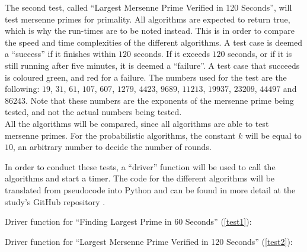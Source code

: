 \documentclass[main.tex]{subfiles}
\begin{document}
The second test, called ``Largest Mersenne Prime Verified in 120 Seconds'', will
test mersenne primes for primality. All algorithms are expected to return true,
which is why the run-times are to be noted instead. This is in order to compare
the speed and time complexities of the different algorithms. A test case is
deemed a ``success'' if it finishes within $120$ seconds. If it exceeds $120$
seconds, or if it is still running after five minutes, it is deemed a ``failure''.
A test case that succeeds is coloured green, and red for a failure. The numbers
used for the test are the following: $19$, $31$, $61$, $107$, $607$, $1279$,
$4423$, $9689$, $11213$, $19937$, $23209$, $44497$ and $86243$. Note that these
numbers are the exponents of the mersenne prime being tested, and not
the actual numbers being tested. \\

All the algorithms will be compared, since all algorithms are able to test
mersenne primes. For the probabilistic algorithms, the constant $k$ will be
equal to $10$, an arbitrary number to decide the number of rounds. \newline

In order to conduct these tests, a ``driver'' function will be used to call the
algorithms and start a timer. The code for the different algorithms will be
translated from pseudocode into Python and can be found in more detail at the
study's GitHub repository \cite{github}.

\newpage

Driver function for ``Finding Largest Prime in 60 Seconds'' (\ref{test1}):



\newpage

Driver function for ``Largest Mersenne Prime Verified in 120 Seconds''
(\ref{test2}):


\end{document}

